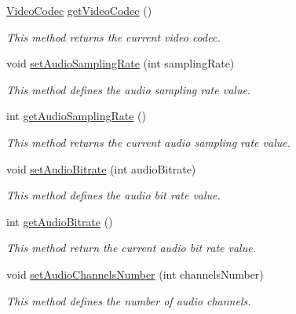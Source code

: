 \begin{DoxyCompactItemize}
\hyperlink{namespacebr_1_1ufscar_1_1lince_1_1streaming_ae620b1e02bc9a1ad45d6e10cd1f87693}{VideoCodec} \hyperlink{classbr_1_1ufscar_1_1lince_1_1streaming_1_1AVEncoder_ae9454f52cc52685f1b0aa3308ddfa75c}{getVideoCodec} ()
\begin{DoxyCompactList}\small\item\em This method returns the current video codec. \item\end{DoxyCompactList}\item 
void \hyperlink{classbr_1_1ufscar_1_1lince_1_1streaming_1_1AVEncoder_ae80e3a12354fa692e6af5e7cdd4726fa}{setAudioSamplingRate} (int samplingRate)
\begin{DoxyCompactList}\small\item\em This method defines the audio sampling rate value. \item\end{DoxyCompactList}\item 
int \hyperlink{classbr_1_1ufscar_1_1lince_1_1streaming_1_1AVEncoder_a714347646dccf0a97e290e6a387799d5}{getAudioSamplingRate} ()
\begin{DoxyCompactList}\small\item\em This method returns the current audio sampling rate value. \item\end{DoxyCompactList}\item 
void \hyperlink{classbr_1_1ufscar_1_1lince_1_1streaming_1_1AVEncoder_a52fb49d7fb9013d931745b06f47d0511}{setAudioBitrate} (int audioBitrate)
\begin{DoxyCompactList}\small\item\em This method defines the audio bit rate value. \item\end{DoxyCompactList}\item 
int \hyperlink{classbr_1_1ufscar_1_1lince_1_1streaming_1_1AVEncoder_a37dd03d0ed094b78bf0e2b10432aca5a}{getAudioBitrate} ()
\begin{DoxyCompactList}\small\item\em This method return the current audio bit rate value. \item\end{DoxyCompactList}\item 
void \hyperlink{classbr_1_1ufscar_1_1lince_1_1streaming_1_1AVEncoder_ac8b1156deca2178845344f0460276423}{setAudioChannelsNumber} (int channelsNumber)
\begin{DoxyCompactList}\small\item\em This method defines the number of audio channels. \item\end{DoxyCompactList}\item 

\end{DoxyCompactItemize}
